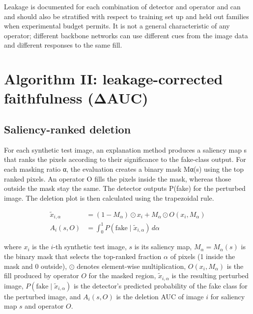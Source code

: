 Leakage is documented for each combination of detector and operator and
can and should also be stratified with respect to training set up and
held out families when experimental budget permits. It is not a general
characteristic of any operator; different backbone networks can use
different cues from the image data and different responses to the same
fill.

\section{\texorpdfstring{\textbf{Algorithm II: leakage-corrected
faithfulness
(ΔAUC)}}{Algorithm II: leakage-corrected faithfulness (ΔAUC)}}\label{algorithm-ii-leakage-corrected-faithfulness-ux3b4auc}

\subsection{\texorpdfstring{\textbf{Saliency-ranked
deletion}}{Saliency-ranked deletion}}\label{saliency-ranked-deletion}

For each synthetic test image, an explanation method produces a saliency
map s that ranks the pixels according to their significance to the
fake-class output. For each masking ratio α, the evaluation creates a
binary mask Mα(s) using the top ranked pixels. An operator O fills the
pixels inside the mask, whereas those outside the mask stay the same.
The detector outputs P(fake) for the perturbed image. The deletion plot
is then calculated using the trapezoidal
rule.

\begin{align}
    \tilde{x}_{i,\alpha} &= (1 - M_{\alpha}) \odot x_i + M_{\alpha} \odot O(x_i, M_{\alpha}) \label{eq:perturbed-image} \\
    A_i(s, O) &= \int_{0}^{1} P(\text{fake} \mid \tilde{x}_{i,\alpha}) \, d\alpha \label{eq:deletion-auc}
\end{align}

\noindent where $x_i$ is the $i$-th synthetic test image, $s$ is its
saliency map, $M_{\alpha} = M_{\alpha}(s)$ is the binary mask that
selects the top-ranked fraction $\alpha$ of pixels (1 inside the mask
and 0 outside), $\odot$ denotes element-wise multiplication,
$O(x_i, M_{\alpha})$ is the fill produced by operator $O$ for the masked
region, $\tilde{x}_{i,\alpha}$ is the resulting perturbed image,
$P(\text{fake} \mid \tilde{x}_{i,\alpha})$ is the detector's predicted
probability of the fake class for the perturbed image, and $A_i(s, O)$
is the deletion AUC of image $i$ for saliency map $s$ and operator $O$.

